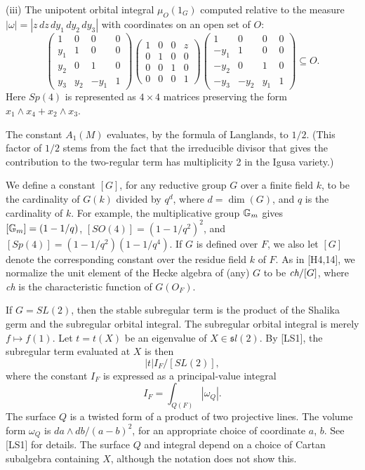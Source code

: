 \documentclass{amsart}
\newcommand\G{{\Bbb G}}
\begin{document}
(iii) The unipotent orbital integral $\mu_O(1_G)$ computed
relative to the measure 
$|\omega|=|z\,dz\,dy_1\,dy_2\,dy_3|$ with coordinates
on an open set of $O$:
\begin{equation}
\begin{pmatrix} 1&0&0&0\\ y_1&1&0&0 \\
          y_2&0&1&0 \\ y_3&y_2&-y_1&1 \end{pmatrix}
\begin{pmatrix} 1&0&0&z\\ 0&1&0&0 \\
          0&0&1&0 \\ 0&0&0&1 \end{pmatrix}
\begin{pmatrix} 1&0&0&0\\ -y_1&1&0&0 \\
          -y_2&0&1&0 \\ -y_3&-y_2&y_1&1 \end{pmatrix}
\subseteq O.
\end{equation}
Here $Sp(4)$ is represented as $4\times4$ matrices preserving
the form $x_1\wedge x_4 + x_2\wedge x_3$.

The constant $A_1(M)$ evaluates, by the
formula of Langlands, to $1/2$.  (This factor of $1/2$
stems from the fact that the irreducible divisor that gives
the contribution to the two-regular term has multiplicity 2 in
the Igusa variety.)

We define a constant $[G]$, for any reductive group $G$ over
a finite field $k$, to be the cardinality of $G(k)$ divided by
$q^d$, where $d = \dim(G)$, and $q$ is the cardinality of $k$.
For example, the multiplicative group $\G_m$
gives $[\G_m] = (1-1/q)$, $[SO(4)] = (1-1/q^2)^2$,
and $[Sp(4)] = (1-1/q^2)(1-1/q^4)$. If $G$ is defined over
$F$, we also let $[G]$ denote the corresponding constant
over the residue field $k$ of $F$.
As in [H4,14], we normalize the unit element of the Hecke
algebra of (any) $G$ 
to be $\text{\it ch}/[G]$, where {\it ch\/} is the
characteristic function of $G(O_F)$.  

If $G = SL(2)$, then
the stable subregular term is the product of the Shalika
germ
and the subregular orbital integral. The subregular
orbital integral is merely
$f\mapsto f(1)$.  Let $t=t(X)$ be an eigenvalue of 
$X\in {\mathfrak sl}(2)$.
By [LS1], the subregular term evaluated at $X$ is then
$$|t|I_F/[SL(2)],$$
where the constant $I_F$ is expressed as a principal-value
integral
$$I_F = \int_{Q(F)} |\omega_Q|.$$
The surface $Q$ is a twisted form of a product of two projective lines.
The volume form $\omega_Q$ is $da\wedge db/(a-b)^2$, for
an appropriate choice of coordinate $a$, $b$.  See [LS1] for details.
The surface $Q$ and integral depend on a choice of 
Cartan subalgebra containing $X$,
although
the notation does not show this.  
\end{document}
